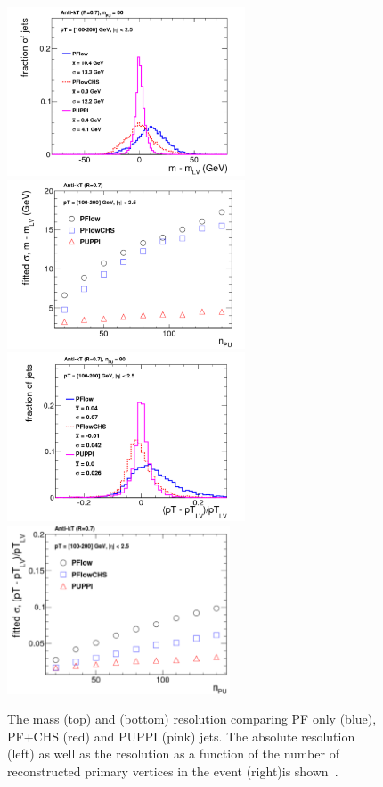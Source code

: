 \begin{figure}[ht] 
    \centering
    \includegraphics[height=5cm]{figures/event_reconstruction/puppi_mres_hiPt.pdf}
    \includegraphics[height=5cm]{figures/event_reconstruction/puppi_mresVsPu.pdf}\\
    \includegraphics[height=5cm]{figures/event_reconstruction/puppi_ptres_hiPt.pdf}
    \includegraphics[height=5cm]{figures/event_reconstruction/puppi_ptresVsPu.pdf}
    \caption{The mass (top) and \PT (bottom) resolution comparing PF only (blue), PF+CHS (red) and PUPPI (pink) jets. The absolute resolution (left) as well as the resolution as a function of the number of reconstructed primary vertices in the event (right)is shown~\cite{Bertolini2014}.}
    \label{fig:objreco:puppi}
\end{figure}

